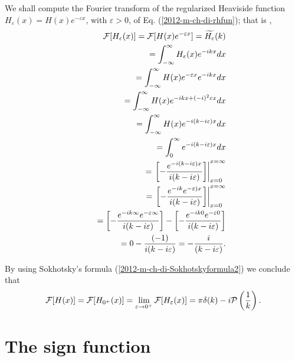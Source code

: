 {\color{OliveGreen}
\bproof
We shall compute the Fourier transform of the regularized Heaviside function
$H_\varepsilon (x) =H(x)e^{-\varepsilon x}$, with $\varepsilon >0$, of Eq. (\ref{2012-m-ch-di-rhfun}); that is  \cite{sommer-di},
\begin{equation}
\begin{split}
 {\cal F}[H_\varepsilon (x)] =
 {\cal F}[H(x)e^{-\varepsilon x}]
=\widetilde{H_\varepsilon }(k)
\\ \qquad
=   \int_{-\infty}^\infty  H_\varepsilon (x) e^{-i{kx}} dx
\\ \qquad
=   \int_{-\infty}^\infty  H(x)e^{-\varepsilon x}  e^{-i{kx}} dx
\\ \qquad
=   \int_{-\infty}^\infty  H(x) e^{-i{kx}+(-i)^2\varepsilon x}  dx
\\ \qquad
=   \int_{-\infty}^\infty  H(x) e^{-i(k - i \varepsilon ) x}  dx
\\ \qquad
=   \int_{0}^\infty  e^{-i(k - i \varepsilon ) x}  dx
\\ \qquad
=  \left. \left[ -\frac{ e^{-i(k - i \varepsilon ) x}}{i(k - i \varepsilon ) } \right] \right|_{x=0}^{x=\infty}
\\ \qquad
=  \left. \left[ -\frac{ e^{-ik} e^{- \varepsilon ) x}}{i(k - i \varepsilon ) } \right] \right|_{x=0}^{x=\infty}
\\ \qquad
=  \left[ -\frac{ e^{-ik\infty} e^{- \varepsilon  \infty}}{i(k - i \varepsilon ) } \right]
-  \left[ -\frac{ e^{-ik0} e^{- \varepsilon  0}}{i(k - i \varepsilon ) } \right]
\\ \qquad
=    0 - \frac{ (-1)}{i(k - i \varepsilon ) }
=     -\frac{ i}{(k - i \varepsilon ) }
.
\end{split}
\end{equation}

By using Sokhotsky's  formula
(\ref{2012-m-ch-di-Sokhotskyformula2})
we conclude that
\begin{equation}
 {\cal F}[H(x)] =
 {\cal F}[H_{0^+} (x)] =
 \lim_{\varepsilon \rightarrow 0^+} {\cal F}[H_\varepsilon (x)] =
  \pi \delta (k)   -i {\cal P} \left(\frac{1}{k}\right)
.
\label{2012-m-ch-di-fthfu}
\end{equation}

\eproof
}




\section{The sign function}

